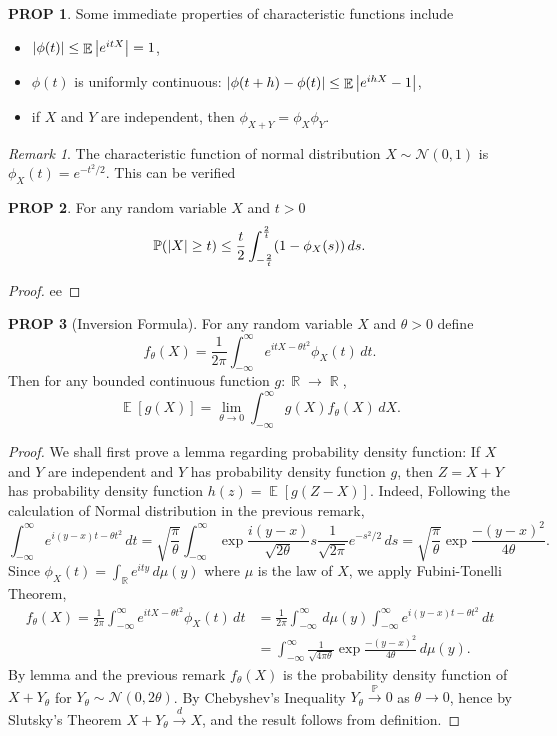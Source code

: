 \documentclass[hidelinks,11pt]{article}
\theoremstyle{definition}
\theoremstyle{dotles}
\theoremstyle{dotless}
\newtheorem{prop}{PROP}[section]
\theoremstyle{remark}
\newtheorem*{remark}{Remark}
\DeclareMathOperator{\E}{\mathbb{E}}
\DeclareMathOperator{\R}{\mathbb{R}}
\begin{document}
\begin{prop}
Some immediate properties of characteristic functions include
\begin{itemize}
    \item $\abs{\phi(t)}\leq\E\abs{e^{itX}}=1$,
    \item $\phi(t)$ is uniformly continuous: $\abs{\phi(t+h)-\phi(t)}\leq\E\abs{e^{ihX}-1}$,
    \item if $X$ and $Y$ are independent, then $\phi_{X+Y}=\phi_X\phi_Y$.
\end{itemize}
\end{prop}

\begin{remark}
The characteristic function of normal distribution $X\sim\mathcal{N}(0,1)$ is $\phi_X(t)=e^{-t^2/2}$. This can be verified
\end{remark}

\begin{prop}
For any random variable $X$ and $t>0$
\[\mathbb{P}(\abs{X}\geq t)\leq\frac{t}{2}\int_{-\frac{2}{t}}^{\frac{2}{t}}(1-\phi_X(s))\,ds.\]
\end{prop}

\begin{proof}
ee
\end{proof}

\begin{prop}[Inversion Formula]
For any random variable $X$ and $\theta>0$ define
\[f_\theta(X)=\frac{1}{2\pi}\int_{-\infty}^\infty e^{itX-\theta t^2}\phi_X(t)\,dt.\]
Then for any bounded continuous function $g:\R\to\R$,
\[\E[g(X)]=\lim_{\theta\to0}\int_{-\infty}^\infty g(X)f_\theta(X)\,dX.\]
\end{prop}
\begin{proof}
We shall first prove a lemma regarding probability density function: If $X$ and $Y$ are independent and $Y$ has probability density function $g$, then $Z=X+Y$ has probability density function $h(z)=\E[g(Z-X)]$.\smallbreak
Indeed,\smallbreak
Following the calculation of Normal distribution in the previous remark,
\[\int_{-\infty}^\infty e^{i(y-x)t-\theta t^2}\,dt=\sqrt{\frac{\pi}{\theta}}\int_{-\infty}^\infty\exp{\frac{i(y-x)}{\sqrt{2\theta}}s}\frac{1}{\sqrt{2\pi}}e^{-s^2/2}\,ds=\sqrt{\frac{\pi}{\theta}}\exp{\frac{-(y-x)^2}{4\theta}}.\]
Since $\phi_X(t)=\int_\mathbb{R}e^{ity}\,d\mu(y)$ where $\mu$ is the law of $X$, we apply Fubini-Tonelli Theorem,
\begin{align*}
f_\theta(X)=\frac{1}{2\pi}\int_{-\infty}^\infty e^{itX-\theta t^2}\phi_X(t)\,dt&=\frac{1}{2\pi}\int_{-\infty}^\infty\,d\mu(y)\int_{-\infty}^\infty e^{i(y-x)t-\theta t^2}\,dt\\&=\int_{-\infty}^\infty\frac{1}{\sqrt{4\pi\theta}}\exp{\frac{-(y-x)^2}{4\theta}}\,d\mu(y).
\end{align*}
By lemma and the previous remark $f_\theta(X)$ is the probability density function of $X+Y_\theta$ for $Y_\theta\sim \mathcal{N}(0,2\theta)$. By Chebyshev's Inequality $Y_\theta\xrightarrow{\mathbb{P}}0$ as $\theta\to0$, hence by Slutsky's Theorem $X+Y_\theta\xrightarrow{d}X$, and the result follows from definition.
\end{proof}
\end{document}
